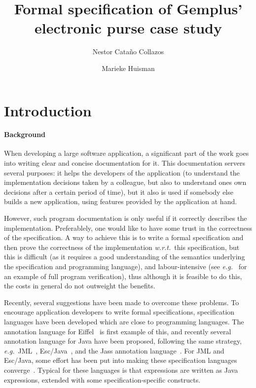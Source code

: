 \documentclass[a4paper]{llncs}
\title{Formal specification of Gemplus' electronic purse case study}
\author{
  Nestor Cata\~no Collazos
\and
  Marieke Huisman
}
\institute{
  INRIA Sophia-Antipolis, France \\ 
  \email{\{Nestor.Catano, Marieke.Huisman\}@sophia.inria.fr}
}
\begin{document}
%

\maketitle


\begin{abstract}

\end{abstract}

\section{Introduction}
\label{SectIntro}

\paragraph{Background}
When developing a large software application, a significant part of
the work goes into writing clear and concise documentation for
it. This documentation servers several purposes: it helps the
developers of the application (to understand the implementation
decisions taken by a colleague, but also to understand ones own
decisions after a certain period of time), but it also is used if
somebody else builds a new application, using features provided by the
application at hand. 

However, such program documentation is only useful if it correctly
describes the implementation. Preferablely, one would like to have
some trust in the correctness of the specification. A way to achieve
this is to write a formal specification and then prove the correctness
of the implementation \emph{w.r.t.}~this specification, but this is
difficult (as it requires a good understanding of the semantics
underlying the specification and programming language), and
labour-intensive (see \emph{e.g.}~\cite{HuismanJB00a} for an example of
full program verification), thus although it is feasible to do this,
the costs in general do not outweight the benefits.

Recently, several suggestions have been made to overcome these
problems. To encourage application developers to write formal
specifications, specification languages have been developed which are
close to programming languages. The annotation language for
Eiffel~\cite{Meyer97} is first example of this, and recently several
annotation language for Java have been proposed, following the same
strategy, \emph{e.g.}~JML~\cite{LeavensBR99}, Esc/Java~\cite{ESCJavaUrl},
and the Jass annotation language~\cite{JassUrl}. For JML and Esc/Java, some
effort has been put into making these specification languages
converge~\cite{EscJmlDiff}. Typical for these languages is that
expressions are written as Java expressions, extended with some
specification-specific constructs. 
\end{document}

